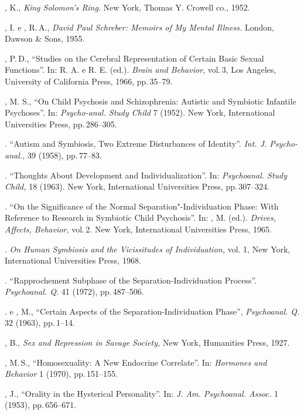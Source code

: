 \begin{description}
, K., \textit{King Solomon's Ring}. New York, Thomas Y.
Crowell co., 1952.

, I. e , R.\,A., \textit{David Paul Schreber: Memoirs of My
Mental Illness. }London, Dawson \& Sons, 1955.

, P.\,D., ``Studies on the Cerebral Representation of
Certain Basic Sexual Functions''. In:  R. A. e 
 R. E. (ed.). \textit{Brain and Behavior},
vol.\,3, Los Angeles, University of California Press, 1966, pp.\,35--79.

, M. S., ``On Child Psychosis and Schizophrenia: Autistic
and Symbiotic Infantile Psychoses''. In: \textit{Psycho-anal. Study
Child }7 (1952). New York, International Universities Press, pp.\,286--305.

. ``Autism and Symbiosis, Two Extreme Disturbances
of Identity''. \textit{Int. J. Psycho-anal., }39 (1958), pp.\,77--83.

. ``Thoughts About Development and
Individualization''. In: \textit{Psychoanal. Study Child, }18 (1963). 
New York, International Universities Press, pp.\,307--324.

. ``On the Significance of the Normal
Separation"-Individuation Phase: With Reference to Research in Symbiotic Child
Psychosis''. In: , M. (ed.). \textit{Drives, Affects, Behavior, }vol.\,2. New York, 
International Universities Press, 1965.

. \textit{On Human Symbiosis and the Vicissitudes of
Individuation, }vol. 1, New York, International Universities Press, 1968.

. ``Rapprochement Subphase of the
Separation-Individuation Process''. \textit{Psychoanal. Q. }41
(1972), pp.\,487--506.

. e , M., ``Certain Aspects of the
Separation-Individuation Phase'', \textit{Psychoanal. Q. }32 (1963),
pp.\,1--14.

, B., \textit{Sex and Repression in Savage Society, }New York,
Humanities Press, 1927.

, M.\,S., ``Homosexuality: A New Endocrine
Correlate''. In: \textit{Hormones and Behavior }1 (1970), pp.\,151--155.

, J., ``Orality in the Hysterical
Personality''. In: \textit{ J. Am. Psychoanal. Assoc. }1 (1953), pp.\,656--671.


\end{description}
